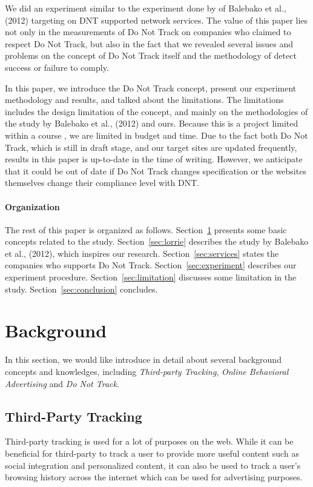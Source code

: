 \documentclass{sig-alternate}
\begin{document}
We did an experiment similar to the experiment done by of Balebako et al., (2012) targeting on DNT supported network services. The value of this paper lies not only in the measurements of Do Not Track on companies who claimed to respect Do Not Track, but also in the fact that we revealed several issues and problems on the concept of Do Not Track itself and the methodology of detect success or failure to comply.

In this paper, we introduce the Do Not Track concept, present our experiment methodology and results, and talked about the limitations. The limitations includes the design limitation of the concept, and mainly on the methodologies of the study by Balebako et al., (2012) and ours. Because this is a project limited within a course , we are limited in budget and time. Due to the fact both Do Not Track, which is still in draft stage, and our target sites are updated frequently, results in this paper is up-to-date in the time of writing. However, we anticipate that it could be out of date if Do Not Track changes specification or the websites themselves change their compliance level with DNT.

\paragraph{Organization}
The rest of this paper is organized as follows. Section~\ref{sec:background} presents some basic concepts related to the study.  Section~\ref{sec:lorrie} describes the study by Balebako et al., (2012), which inspires our research. Section~\ref{sec:services} states the companies who supports Do Not Track. Section~\ref{sec:experiment} describes our experiment procedure. Section~\ref{sec:limitation} discusses some limitation in the study. Section~\ref{sec:conclusion} concludes.

\section{Background} \label{sec:background}

In this section, we would like introduce in detail about several background concepts and knowledges, including \emph{Third-party Tracking}, \emph{Online Behavioral Advertising} and \emph{Do Not Track}. 
\subsection*{Third-Party Tracking}

Third-party tracking is used for a lot of purposes on the web. While it can be beneficial for third-party to track a user to provide more useful content such as social integration and personalized content, it can also be used to track a user's browsing history across the internet which can be used for advertising purposes. 
\end{document}

